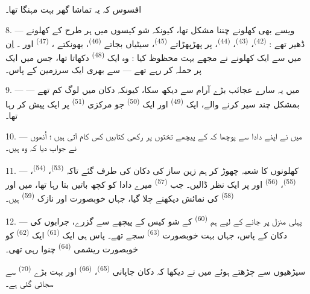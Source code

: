افسوس کہ یہ تماشا گھر بہت مہنگا تھا۔

8. --- ویسے بھی کھلونے چننا مشکل تھا، کیونکہ شو کیسوں میں ہر طرح کے
کھلونے ڈھیر تھے :  \textsuperscript{(42)}،
 \textsuperscript{(43)}، 
\textsuperscript{(44)}، پر پھڑپھڑاتے 
\textsuperscript{(45)}، سیٹیاں بجاتے 
\textsuperscript{(46)}، بھونکتے ، 
\textsuperscript{(47)} اور ۔ اِن میں سے ایک کھلونے
نے مجھے بہت محظوظ کیا : وہ ایک  \textsuperscript{(48)}
دکھاتا تھا، جس میں ایک  پر  حملہ کر رہے
تھے —  سے بھری ایک سرزمین کے پاس۔


9. --- میں یہ سارے عجائب بڑے آرام سے دیکھ سکا، کیونکہ دکان میں لوگ
کم تھے — بمشکل چند سیر کرنے والے، ایک 
\textsuperscript{(49)} اور ایک 
\textsuperscript{(50)} جو مرکزی  \textsuperscript{(51)} پر
ایک  پیش کر رہا تھا۔

10. --- میں نے اپنے دادا سے پوچھا کہ  کے پیچھے
تختوں پر رکھی کتابیں کس کام آتی ہیں ؛ اُنھوں نے جواب دیا کہ وہ
 ہیں۔

\VUsaut{3.6mm}
\VUsaut{2.8mm}

11. --- کھلونوں کا شعبہ چھوڑ کر ہم زین ساز کی دکان کی طرف گئے تاکہ
 \textsuperscript{(53)}، 
\textsuperscript{(54)}،  \textsuperscript{(55)}،
 \textsuperscript{(56)} اور  پر ایک نظر
ڈالیں۔ جب  \textsuperscript{(57)} میرے دادا کو
کچھ باتیں بتا رہا تھا، میں  اور
 \textsuperscript{(58)} کی نمائش دیکھنے چلا گیا، جہاں
خوبصورت  اور نازک 
\textsuperscript{(59)} ہیں۔

12. --- پہلی منزل پر جانے کے لیے ہم 
\textsuperscript{(60)} کے شو کیس کے پیچھے سے گزرے، جرابوں کی دکان کے
پاس، جہاں بہت خوبصورت  \textsuperscript{(63)} سجے تھے۔
پاس ہی ایک  \textsuperscript{(61)} ایک
 \textsuperscript{(62)} کو خوبصورت ریشمی
 \textsuperscript{(64)} چنوا رہی تھی۔

سیڑھیوں سے چڑھتے ہوئے میں نے دیکھا کہ دکان جاپانی 
\textsuperscript{(65)}،  \textsuperscript{(66)}
اور بہت بڑے  \textsuperscript{(70)} سے سجائی
گئی ہے۔

